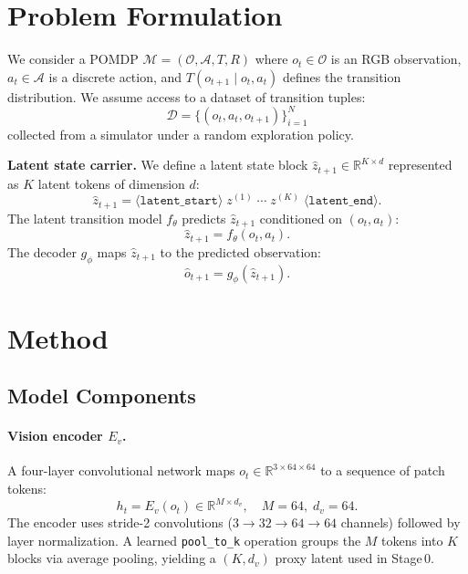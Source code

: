 \documentclass[11pt]{article}
\begin{document}
\section{Problem Formulation}

We consider a POMDP $\mathcal{M} = (\mathcal{O}, \mathcal{A}, T, R)$ where
$o_t \in \mathcal{O}$ is an RGB observation, $a_t \in \mathcal{A}$ is a discrete
action, and $T(o_{t+1} \mid o_t, a_t)$ defines the transition distribution.
We assume access to a dataset of transition tuples:
\begin{equation}
\mathcal{D} = \{(o_t, a_t, o_{t+1})\}_{i=1}^{N}
\end{equation}
collected from a simulator under a random exploration policy.

\textbf{Latent state carrier.}
We define a latent state block $\hat{z}_{t+1} \in \mathbb{R}^{K \times d}$
represented as $K$ latent tokens of dimension $d$:
\begin{equation}
\hat{z}_{t+1} = \langle\texttt{latent\_start}\rangle\; z^{(1)}\;\cdots\; z^{(K)}\;\langle\texttt{latent\_end}\rangle.
\end{equation}
The latent transition model $f_\theta$ predicts $\hat{z}_{t+1}$
conditioned on $(o_t, a_t)$:
\begin{equation}
\hat{z}_{t+1} = f_\theta(o_t, a_t).
\end{equation}
The decoder $g_\phi$ maps $\hat{z}_{t+1}$ to the predicted observation:
\begin{equation}
\hat{o}_{t+1} = g_\phi(\hat{z}_{t+1}).
\end{equation}

\section{Method}

\subsection{Model Components}

\paragraph{Vision encoder $E_v$.}
A four-layer convolutional network maps $o_t \in \mathbb{R}^{3 \times 64 \times 64}$
to a sequence of patch tokens:
\begin{equation}
h_t = E_v(o_t) \in \mathbb{R}^{M \times d_v},\quad M=64,\; d_v=64.
\end{equation}
The encoder uses stride-2 convolutions ($3{\to}32{\to}64{\to}64$ channels)
followed by layer normalization.
A learned \texttt{pool\_to\_k} operation groups the $M$ tokens into $K$ blocks
via average pooling, yielding a $(K, d_v)$ proxy latent used in Stage\,0.
\end{document}
